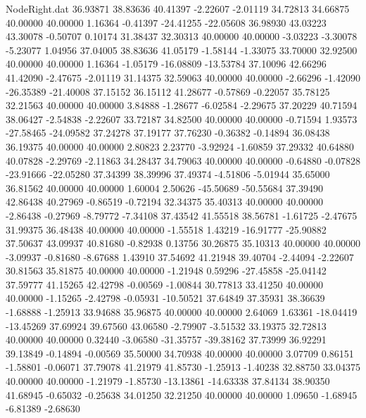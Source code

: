 \begin{filecontents}{NodeRight.dat}
  36.93871   38.83636   40.41397    -2.22607   -2.01119   34.72813   34.66875   40.00000   40.00000    1.16364   -0.41397  -24.41255  -22.05608
  36.98930   43.03223   43.30078    -0.50707    0.10174   31.38437   32.30313   40.00000   40.00000   -3.03223   -3.30078   -5.23077    1.04956
  37.04005   38.83636   41.05179    -1.58144   -1.33075   33.70000   32.92500   40.00000   40.00000    1.16364   -1.05179  -16.08809  -13.53784
  37.10096   42.66296   41.42090    -2.47675   -2.01119   31.14375   32.59063   40.00000   40.00000   -2.66296   -1.42090  -26.35389  -21.40008
  37.15152   36.15112   41.28677    -0.57869   -0.22057   35.78125   32.21563   40.00000   40.00000    3.84888   -1.28677   -6.02584   -2.29675
  37.20229   40.71594   38.06427    -2.54838   -2.22607   33.72187   34.82500   40.00000   40.00000   -0.71594    1.93573  -27.58465  -24.09582
  37.24278   37.19177   37.76230    -0.36382   -0.14894   36.08438   36.19375   40.00000   40.00000    2.80823    2.23770   -3.92924   -1.60859
  37.29332   40.64880   40.07828    -2.29769   -2.11863   34.28437   34.79063   40.00000   40.00000   -0.64880   -0.07828  -23.91666  -22.05280
  37.34399   38.39996   37.49374    -4.51806   -5.01944   35.65000   36.81562   40.00000   40.00000    1.60004    2.50626  -45.50689  -50.55684
  37.39490   42.86438   40.27969    -0.86519   -0.72194   32.34375   35.40313   40.00000   40.00000   -2.86438   -0.27969   -8.79772   -7.34108
  37.43542   41.55518   38.56781    -1.61725   -2.47675   31.99375   36.48438   40.00000   40.00000   -1.55518    1.43219  -16.91777  -25.90882
  37.50637   43.09937   40.81680    -0.82938    0.13756   30.26875   35.10313   40.00000   40.00000   -3.09937   -0.81680   -8.67688    1.43910
  37.54692   41.21948   39.40704    -2.44094   -2.22607   30.81563   35.81875   40.00000   40.00000   -1.21948    0.59296  -27.45858  -25.04142
  37.59777   41.15265   42.42798    -0.00569   -1.00844   30.77813   33.41250   40.00000   40.00000   -1.15265   -2.42798   -0.05931  -10.50521
  37.64849   37.35931   38.36639    -1.68888   -1.25913   33.94688   35.96875   40.00000   40.00000    2.64069    1.63361  -18.04419  -13.45269
  37.69924   39.67560   43.06580    -2.79907   -3.51532   33.19375   32.72813   40.00000   40.00000    0.32440   -3.06580  -31.35757  -39.38162
  37.73999   36.92291   39.13849    -0.14894   -0.00569   35.50000   34.70938   40.00000   40.00000    3.07709    0.86151   -1.58801   -0.06071
  37.79078   41.21979   41.85730    -1.25913   -1.40238   32.88750   33.04375   40.00000   40.00000   -1.21979   -1.85730  -13.13861  -14.63338
  37.84134   38.90350   41.68945    -0.65032   -0.25638   34.01250   32.21250   40.00000   40.00000    1.09650   -1.68945   -6.81389   -2.68630

\end{filecontents}
